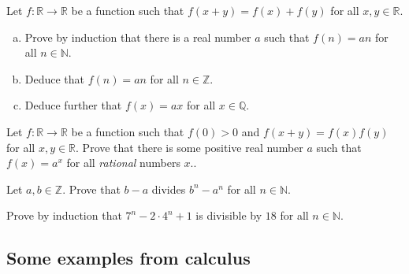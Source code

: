 \begin{chapex}
\label{cqHomomorphismFromRPlusToRPlus}
Let $f : \mathbb{R} \to \mathbb{R}$ be a function such that $f(x+y) = f(x) + f(y)$ for all $x,y \in \mathbb{R}$.
\begin{enumerate}[(a)]
\item Prove by induction that there is a real number $a$ such that $f(n) = an$ for all $n \in \mathbb{N}$.
\item Deduce that $f(n) = an$ for all $n \in \mathbb{Z}$.
\item Deduce further that $f(x) = ax$ for all $x \in \mathbb{Q}$.
\end{enumerate}
\end{chapex}

\begin{chapex}
\label{cqHomomorphismFromRPlusToRTimes}
Let $f : \mathbb{R} \to \mathbb{R}$ be a function such that $f(0) > 0$ and $f(x+y)=f(x)f(y)$ for all $x,y \in \mathbb{R}$. Prove that there is some positive real number $a$ such that $f(x)=a^x$ for all \textit{rational} numbers $x$..
\end{chapex}

\begin{chapex}
Let $a,b \in \mathbb{Z}$. Prove that $b-a$ divides $b^n-a^n$ for all $n \in \mathbb{N}$.
\end{chapex}

\begin{chapex}
\label{cqInductionEmbeddedInIductionStep}
Prove by induction that $7^n - 2 \cdot 4^n + 1$ is divisible by $18$ for all $n \in \mathbb{N}$.
\end{chapex}

\subsection*{Some examples from calculus}

